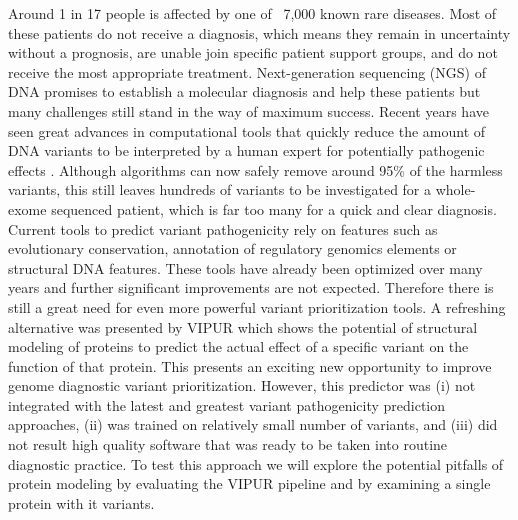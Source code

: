 Around 1 in 17 people is affected by one of ~7,000 known rare diseases. Most of these patients do not receive a diagnosis, which means they remain in uncertainty without a prognosis, are unable join specific patient support groups, and do not receive the most appropriate treatment.
Next-generation sequencing (NGS) of DNA promises to establish a molecular diagnosis and help these patients but many challenges still stand in the way of maximum success.
Recent years have seen great advances in computational tools that quickly reduce the amount of DNA variants to be interpreted by a human expert for potentially pathogenic effects \cite{van_der_velde_gavin:_2017}. Although algorithms can now safely remove around 95\% of the harmless variants, this still leaves hundreds of variants to be investigated for a whole-exome sequenced patient, which is far too many for a quick and clear diagnosis. Current tools to predict variant pathogenicity rely on features such as evolutionary conservation, annotation of regulatory genomics elements or structural DNA features. These tools have already been optimized over many years and further significant improvements are not expected. Therefore there is still a great need for even more powerful variant prioritization tools. 
A refreshing alternative was presented by VIPUR \cite{baugh_robust_2016} which shows the potential of structural modeling of proteins to predict the actual effect of a specific variant on the function of that protein. This presents an exciting new opportunity to improve genome diagnostic variant prioritization. However, this predictor was (i) not integrated with the latest and greatest variant pathogenicity prediction approaches, (ii) was trained on relatively small number of variants, and (iii) did not result high quality software that was ready to be taken into routine diagnostic practice.
To test this approach we will explore the potential pitfalls of protein modeling by evaluating the VIPUR pipeline and by examining a single protein with it variants.